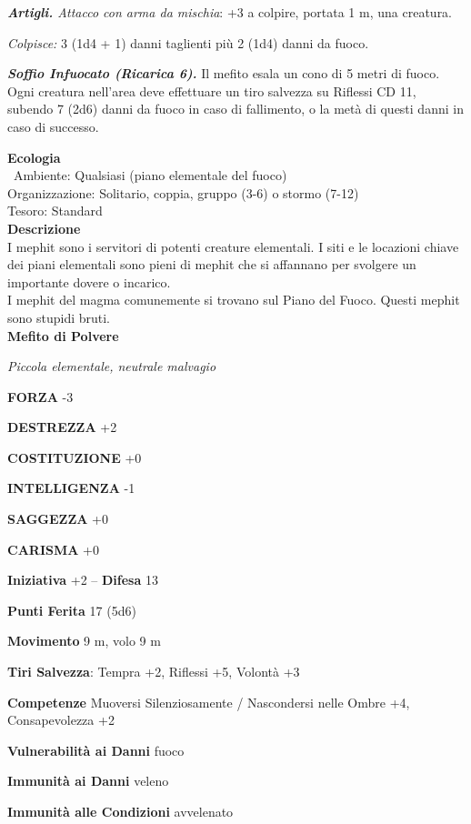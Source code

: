 \begin{multicols}{2}
\emph{\textbf{Artigli.} Attacco con arma da mischia}: +3 a colpire, portata 1 m, una creatura.

\emph{Colpisce:} 3 (1d4 + 1) danni taglienti più 2 (1d4) danni da fuoco.

\emph{\textbf{Soffio Infuocato (Ricarica 6).}} Il mefito esala un cono di 5 metri di fuoco. Ogni creatura nell'area deve effettuare un tiro salvezza su Riflessi CD 11, subendo 7 (2d6) danni da fuoco in caso di fallimento, o la metà di questi danni in caso di successo.

\textbf{Ecologia}\\\
Ambiente: Qualsiasi (piano elementale del fuoco)\\
Organizzazione: Solitario, coppia, gruppo (3-6) o stormo (7-12)\\
Tesoro: Standard\\
\textbf{Descrizione}\\
I mephit sono i servitori di potenti creature elementali. I siti e le locazioni chiave dei piani elementali sono pieni di mephit che si affannano per svolgere un importante dovere o incarico.\\
I mephit del magma comunemente si trovano sul Piano del Fuoco. Questi mephit sono stupidi bruti.\\


\medskip{}\textbf{Mefito di Polvere}

\emph{Piccola elementale, neutrale malvagio}

\textbf{FORZA} -3

\textbf{DESTREZZA} +2

\textbf{COSTITUZIONE} +0

\textbf{INTELLIGENZA} -1

\textbf{SAGGEZZA} +0

\textbf{CARISMA} +0

\textbf{Iniziativa} +2 -- \textbf{Difesa} 13

\textbf{Punti Ferita} 17 (5d6)

\textbf{Movimento} 9 m, volo 9 m

\textbf{Tiri Salvezza}: Tempra +2, Riflessi +5, Volontà +3

\textbf{Competenze} Muoversi Silenziosamente / Nascondersi nelle Ombre +4, Consapevolezza +2

\textbf{Vulnerabilità ai Danni} fuoco

\textbf{Immunità ai Danni} veleno

\textbf{Immunità alle Condizioni} avvelenato


\end{multicols}
